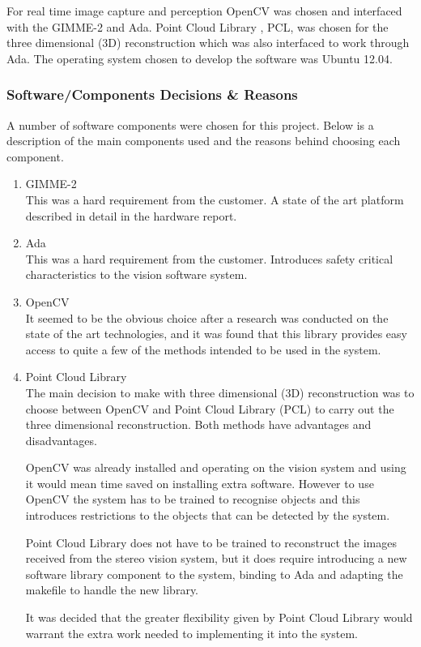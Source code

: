 For real time image capture and perception OpenCV \cite{web:OpenCV} was chosen and interfaced with the GIMME-2 and Ada. Point Cloud Library \cite{web:PCL}, PCL, was chosen for the three dimensional (3D) reconstruction which was also interfaced to work through Ada. The operating system chosen to develop the software was Ubuntu 12.04.

\subsubsection{Software/Components Decisions \& Reasons}
A number of software components were chosen for this project. Below is a description of the main components used and the reasons behind choosing each component. 
\begin{enumerate}
  \item GIMME-2 \\ This was a hard requirement from the customer. A state of the art platform described in detail in the hardware report.
  \item Ada \\ This was a hard requirement from the customer. Introduces safety critical characteristics to the vision software system.
  \item OpenCV \\ It seemed to be the obvious choice after a research was conducted on the state of the art technologies, and it was found that this library provides easy access to quite a few of the methods intended to be used in the system.
  \item Point Cloud Library \\ The main decision to make with three dimensional (3D) reconstruction was to choose between OpenCV and Point Cloud Library (PCL) to carry out the three dimensional reconstruction. Both methods have advantages and disadvantages.

OpenCV was already installed and operating on the vision system and using it would mean time saved on installing extra software. However to use OpenCV the system has to be trained to recognise objects and this introduces restrictions to the objects that can be detected by the system.

Point Cloud Library does not have to be trained to reconstruct the images received from the stereo vision system, but it does require introducing a new software library component to the system, binding to Ada and adapting the makefile to handle the new library.

It was decided that the greater flexibility given by Point Cloud Library would warrant the extra work needed to implementing it into the system.
\end{enumerate}

